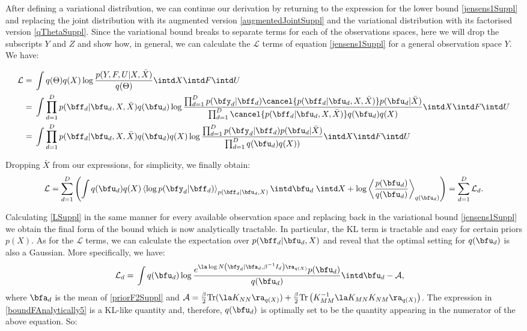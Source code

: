 \par After defining a variational distribution, we can continue our derivation by returning to
the expression for the lower bound \eqref{jensens1Suppl} and replacing the joint distribution with
 its augmented version \eqref{augmentedJointSuppl} and the variational distribution with its
 factorised version \eqref{qThetaSuppl}. Since the variational bound breaks to separate terms for each
of the observations spaces, here we will drop the subscripts $Y$ and $Z$ and show how, in general, we
can calculate the $\mathcal{L}$ terms of equation \eqref{jensens1Suppl} for a general observation space $Y$. We have:

\begin{align}
\mathcal{L} = {}& \int q(\Theta)q(X) \log 
		\frac{ p(Y,F, U | X, \bar{X})}
			 {q(\Theta)}  \intd  X \intd F \intd U  \nonumber \\
= {}& \int \prod_{d=1}^D p(\bff_d | \bfu_d, X , \bar{X})q(\bfu_d)
	    \log  \frac{\prod_{d=1}^D p(\bfy_d | \bff_d) \cancel{p(\bff_d | \bfu_d, X, \bar{X})}
						p(\bfu_d | \bar{X})}
 	 {\prod_{d=1}^D \cancel{p(\bff_d | \bfu_d, X, \bar{X} )}q(\bfu_d) q(X)}   \intd  X \intd F \intd U  \nonumber \\
 ={}& \int \prod_{d=1}^D p(\bff_d | \bfu_d, X, \bar{X} )q(\bfu_d) q(X) 
		\log  \frac{\prod_{d=1}^D p(\bfy_d | \bff_d) p(\bfu_d | \bar{X})}
				   {\prod_{d=1}^D q(\bfu_d) q(X))}   \intd  X \intd F \intd U 
\end{align}

Dropping $\bar{X}$ from our expressions, for simplicity, we finally obtain:
\begin{equation}
\label{LSuppl}
\mathcal{L} =
\sum_{d=1}^D \left( 
    \int q(\bfu_d) q(X) \left\langle \log p(\bfy_d | \bff_d) \right\rangle_{p(\bff_d | \bfu_d, X)} \intd \bfu_d \; \intd X +
					   \log \left\langle \frac{p(\bfu_d)}{q(\bfu_d)} \right\rangle_{q(\bfu_d)} 
  \right) = \sum_{d=1}^D \mathcal{L}_d .
\end{equation} 


\noindent Calculating \eqref{LSuppl} in the same manner for every available observation space and 
replacing back in the variational bound \eqref{jensens1Suppl} 
we obtain the final form of the bound which is now analytically tractable. 
In particular, the $\text{KL}$ term
is tractable and easy for certain priors $p(X)$.
As for the $\mathcal{L}$ terms, we can calculate the
expectation over $p(\bff_d | \bfu_d,X)$ and reveal that the optimal setting for $q(\bfu_d)$ is 
also a Gaussian. More specifically, we have:
\begin{align}
\mathcal{L}_d={}& \int q(\bfu_d) \log \frac{e^{\la \log N \left( \bfy_d | \bfa_d, \beta^{-1} I_d \right) \ra_{q(X)}}
		p(\bfu_d)}{q(\bfu_d)} \intd \bfu_d - \mathcal{A} , \label{boundFAnalytically5}
\end{align}
where $\bfa_d$ is the mean of \eqref{priorF2Suppl} and 
$\mathcal{A}=\frac{\beta}{2} \text{Tr}(\la K_{NN} \ra_{q(X)}) +
	 	\frac{\beta}{2} \text{Tr} \left(K_{MM}^{-1} \la K_{MN} K_{NM} \ra_{q(X)} \right) $.
The expression in \eqref{boundFAnalytically5} is a KL-like quantity and, therefore, $q(\bfu_d)$ is optimally set to be the quantity 
appearing in the numerator of the above equation. So:


